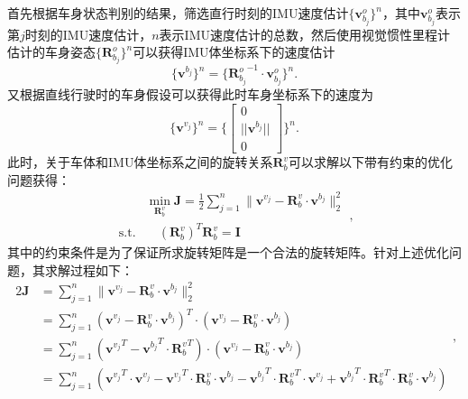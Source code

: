 首先根据车身状态判别的结果，筛选直行时刻的IMU速度估计$\{\symbf{v}^o_{b_{j}}\}^n$，其中$\symbf{v}^o_{b_{j}}$表示第$j$时刻的IMU速度估计，$n$表示IMU速度估计的总数，然后使用视觉惯性里程计估计的车身姿态$\{ \symbf{R}_{b_{j}}^o\}^n$可以获得IMU体坐标系下的速度估计
\begin{equation}
  \{\symbf{v}^{b_{j}}\}^n = \{ {\symbf{R}_{b_{j}}^o}^{-1} \cdot \symbf{v}^o_{b_{j}} \}^n.
\end{equation}
又根据直线行驶时的车身假设可以获得此时车身坐标系下的速度为
\begin{equation}
  \{\symbf{v}^{v_{j}}\}^n = \{ \begin{bmatrix}
    0 \\
    || \symbf{v}^{b_{j}} || \\ 
    0
  \end{bmatrix}\}^n.
\end{equation}
此时，关于车体和IMU体坐标系之间的旋转关系$\symbf{R}_{b}^{v}$可以求解以下带有约束的优化问题获得：
\begin{equation}
\begin{aligned}
  &\min_{\symbf{R}_{b}^{v}} \symbf{J} = \frac{1}{2} \sum_{j=1}^{n} \| \symbf{v}^{v_{j}} - \symbf{R}_{b}^{v} \cdot \symbf{v}^{b_{j}} \|_2^2 \\
  \text{s.t.} & \quad {(\symbf{R}_{b}^{v})}^T \symbf{R}_{b}^{v} = \symbf{I}
\end{aligned},
\end{equation}
其中的约束条件是为了保证所求旋转矩阵是一个合法的旋转矩阵。针对上述优化问题，其求解过程如下：
\begin{equation}
\begin{aligned}
  2\symbf{J} &= \sum_{j=1}^{n} \| \symbf{v}^{v_{j}} - \symbf{R}_{b}^{v} \cdot \symbf{v}^{b_{j}} \|_2^2 \\ 
  &= \sum_{j=1}^{n} {(\symbf{v}^{v_{j}} - \symbf{R}_{b}^{v} \cdot \symbf{v}^{b_{j}})}^T \cdot {(\symbf{v}^{v_{j}} - \symbf{R}_{b}^{v} \cdot \symbf{v}^{b_{j}})} \\
  &= \sum_{j=1}^{n} {({\symbf{v}^{v_{j}}}^T - {\symbf{v}^{b_{j}}}^T \cdot {\symbf{R}_{b}^{v}}^T)} \cdot {(\symbf{v}^{v_{j}} - \symbf{R}_{b}^{v} \cdot \symbf{v}^{b_{j}})} \\
  &= \sum_{j=1}^{n} ({\symbf{v}^{v_{j}}}^T \cdot \symbf{v}^{v_{j}} - {\symbf{v}^{v_{j}}}^T \cdot \symbf{R}_{b}^{v} \cdot \symbf{v}^{b_{j}} - {\symbf{v}^{b_{j}}}^T \cdot {\symbf{R}_{b}^{v}}^T \cdot {\symbf{v}^{v_{j}}} + {\symbf{v}^{b_{j}}}^T \cdot {\symbf{R}_{b}^{v}}^T \cdot \symbf{R}_{b}^{v} \cdot \symbf{v}^{b_{j}})
\end{aligned},
\end{equation}
